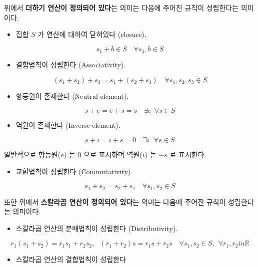 \documentclass[
  11pt,
  a4paper,
  oneside]{scrbook}
\providecommand{\tightlist}{%
  \setlength{\itemsep}{0pt}\setlength{\parskip}{0pt}}\usepackage{longtable,booktabs,array}
\newcommand{\RR}{\mathbb{R}}
\theoremstyle{definition}
\theoremstyle{definition}
\theoremstyle{plain}
\theoremstyle{remark}
\begin{document}
위에서 \textbf{더하기 연산이 정의되어 있다}는 의미는 다음에 주어진
규칙이 성립한다는 의미이다.

\begin{itemize}
\tightlist
\item
  집합 \(S\) 가 연산에 대하여 닫혀있다 (closure).
\end{itemize}

\[  s_1 + b \in S \quad \forall s_1,b \in S \]

\begin{itemize}
\tightlist
\item
  결합법칙이 성립한다 (Associativity).
\end{itemize}

\[  (s_1 + s_2) + s_3 = s_1 + (s_2 +s_3)  \quad \forall s_1,s_2,s_3 \in S \]

\begin{itemize}
\tightlist
\item
  항등원이 존재한다 (Neutral element).
\end{itemize}

\[  s + e = e + s = s \quad \exists e ~~\forall s \in S \]

\begin{itemize}
\tightlist
\item
  역원이 존재한다 (Inverse element).
\end{itemize}

\[ s + i = i  + s = 0 \quad \exists i ~~\ \forall s \in S \]

일반적으로 항등원(\(e\)) 는 \(0\) 으로 표시하며 역원(\(i\)) 는 \(-s\) 로
표시한다.

\begin{itemize}
\tightlist
\item
  교환법칙이 성립한다 (Commutativity).
\end{itemize}

\[  s_1 + s_2 = s_2 + s_1  \quad \forall s_1,s_2 \in S \]

또한 위에서 \textbf{스칼라곱 연산이 정의되어 있다}는 의미는 다음에
주어진 규칙이 성립한다는 의미이다.

\begin{itemize}
\tightlist
\item
  스칼라곱 연산의 분배법칙이 성립한다 (Distributivity).
\end{itemize}

\[  r_1(s_1+s_2) = r_1 s_1 + r_2 s_2,~~~ (r_1+r_2)s = r_1 s + r_2 s  \quad \forall s_1,s_2 \in S, ~~ \forall r_1,r_2 in \RR \]

\begin{itemize}
\tightlist
\item
  스칼라곱 연산의 결합법칙이 성립한다
\end{itemize}
\end{document}
